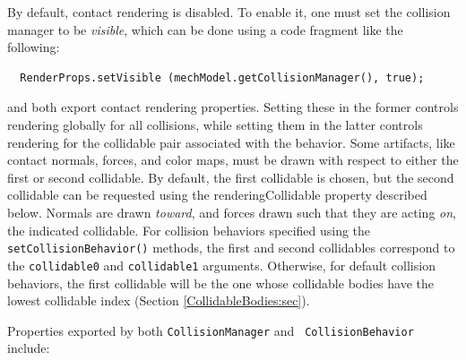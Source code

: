 By default, contact rendering is disabled. To enable it, one must set
the collision manager to be {\it visible}, which can be done using a code
fragment like the following:
%
\begin{verbatim}
  RenderProps.setVisible (mechModel.getCollisionManager(), true);
\end{verbatim}
%

 and
both export contact rendering properties. Setting these in the former
controls rendering globally for all collisions, while setting them in
the latter controls rendering for the collidable pair associated with
the behavior.  Some artifacts, like contact normals, forces, and color
maps, must be drawn with respect to either the first or second
collidable. By default, the first collidable is chosen, but the second
collidable can be requested using the {\sf renderingCollidable}
property described below. Normals are drawn {\it toward}, and forces
drawn such that they are acting {\it on}, the indicated
collidable. For collision behaviors specified using the {\tt
setCollisionBehavior()} methods, the first and second collidables
correspond to the {\tt collidable0} and {\tt collidable1} arguments.
Otherwise, for default collision behaviors, the first collidable will
be the one whose collidable bodies have the lowest collidable index
(Section \ref{CollidableBodies:sec}).

Properties exported by both {\tt CollisionManager} and {\tt
CollisionBehavior} include:

